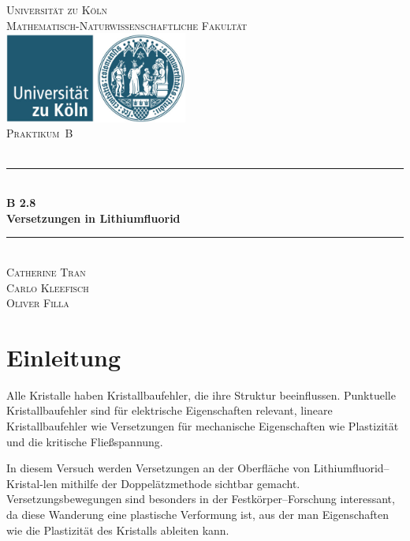 \documentclass[12pt,a4paper]{scrartcl}
\numberwithin{equation}{section} %
\newcommand{\HRule}{\rule{\linewidth}{0.7mm}}
\begin{document}
\begin{titlepage}
	\pagestyle{empty}

	\begin{center}

	\textsc{\LARGE Universität zu Köln }\\ [0.4cm]
	\textsc{Mathematisch-Naturwissenschaftliche Fakultät} \\[1.5cm]

	\includegraphics[width=0.45\textwidth]{../media/uni.jpg}\\[1.5cm]  %

	\textsc{\Large Praktikum~B}\\[2mm]
	\textsc{}\\[10mm]
	\HRule \\[0.4cm]

		{	\Huge \bfseries B 2.8}\\[0.4cm]
			{	\huge \bfseries Versetzungen in Lithiumfluorid}\\[0.3cm]
	
	\HRule \\[3cm]

		\textsc{\Large Catherine Tran } \\[3pt]
		\textsc{\Large Carlo Kleefisch } \\[3pt]
		\textsc{\Large Oliver Filla } \\[3pt]
	\end{center}
\end{titlepage}

\newpage
\tableofcontents
\newpage

\hypertarget{einleitung}{%
\section{Einleitung}\label{einleitung}}

Alle Kristalle haben Kristallbaufehler, die ihre Struktur beeinflussen. Punktuelle Kristallbaufehler sind für elektrische Eigenschaften relevant, lineare Kristallbaufehler wie Versetzungen für mechanische Eigenschaften wie Plastizität und die kritische Fließspannung.

In diesem Versuch werden Versetzungen an der Oberfläche von Lithiumfluorid--Kristal-\newline len mithilfe der Doppelätzmethode sichtbar gemacht. Versetzungsbewegungen sind besonders in der Festkörper--Forschung interessant, da diese Wanderung eine plastische Verformung ist, aus der man Eigenschaften wie die Plastizität des Kristalls ableiten kann.
\end{document}
